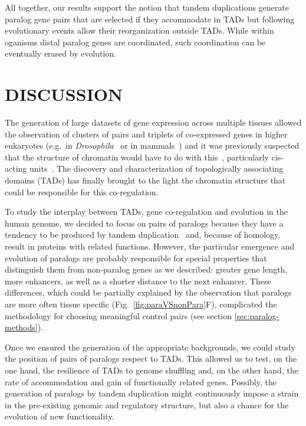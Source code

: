\documentclass[a4paper,twoside=true,openright,parskip=full,chapterprefix=true,11pt,headings=normal,bibliography=totoc,listof=totoc,titlepage=on,captions=tableabove,draft=false]{scrreprt}
\theoremstyle{definition}
\theoremstyle{definition}
\theoremstyle{definition}
\theoremstyle{remark}
\begin{document}
All together, our results support the notion that tandem duplications
generate paralog gene pairs that are selected if they accommodate in
TADs but following evolutionary events allow their reorganization
outside TADs. While within oganisms distal paralog genes are
coordinated, such coordination can be eventually erased by evolution.

\section{DISCUSSION}\label{discussion}

The generation of large datasets of gene expression across multiple
tissues allowed the observation of clusters of pairs and triplets of
co-expressed genes in higher eukaryotes (e.g.~in
\emph{Drosophila}~\citep{Boutanaev2002} or in
mammals~\citep{Purmann2007}) and it was previously suspected that the
structure of chromatin would have to do with this~\citep{Sproul2005},
particularly cis-acting units~\citep{Purmann2007}. The discovery and
characterization of topologically associating domains (TADs) has finally
brought to the light the chromatin structure that could be responsible
for this co-regulation.

To study the interplay between TADs, gene co-regulation and evolution in
the human genome, we decided to focus on pairs of paralogs because they
have a tendency to be produced by tandem duplication~\citep{Newman2015}
and, because of homology, result in proteins with related functions.
However, the particular emergence and evolution of paralogs are probably
responsible for special properties that distinguish them from
non-paralog genes as we described: greater gene length, more enhancers,
as well as a shorter distance to the next enhancer. These differences,
which could be partially explained by the observation that paralogs are
more often tissue specific (Fig.~\ref{fig:paraVSnonPara}F), complicated
the methodology for choosing meaningful control pairs (see section
\ref{sec:paralog-methods}).

Once we ensured the generation of the appropriate backgrounds, we could
study the position of pairs of paralogs respect to TADs. This allowed us
to test, on the one hand, the resilience of TADs to genome shuffling
and, on the other hand, the rate of accommodation and gain of
functionally related genes. Possibly, the generation of paralogs by
tandem duplication might continuously impose a strain in the
pre-existing genomic and regulatory structure, but also a chance for the
evolution of new functionality.
\end{document}
